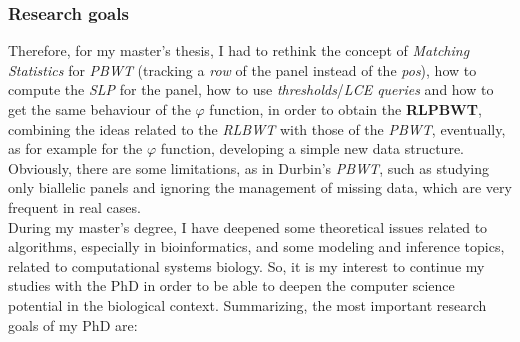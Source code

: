 \documentclass[a4paper,11pt, oneside]{article}
\begin{document}
\subsubsection*{Research goals}
Therefore, for my master's thesis, I had to rethink the concept of
\textit{Matching Statistics} for \textit{PBWT} (tracking  a \textit{row} of the
panel instead of the \textit{pos}), how to compute the \textit{SLP}
for the panel, how to use \textit{thresholds}/\textit{LCE queries} and how to
get the same behaviour of the $\varphi$ function, in order to obtain the
\textbf{RLPBWT}, combining the ideas related to the \textit{RLBWT} with those of
the \textit{PBWT}, eventually, as for example for the $\varphi$ function,
developing a simple new data structure.
Obviously, there are some limitations, as in Durbin's \textit{PBWT}, such as
studying only biallelic panels and ignoring the management of missing data,
which are very frequent in real cases. \\
During my master’s degree, I have deepened some theoretical
issues related to algorithms, especially in bioinformatics, and
some modeling and inference topics, related to computational 
systems biology. So, it is my interest to continue my studies with the PhD
in order to be able to deepen the computer science potential in the biological
context. Summarizing, the most important research goals of my PhD are:
\end{document}
